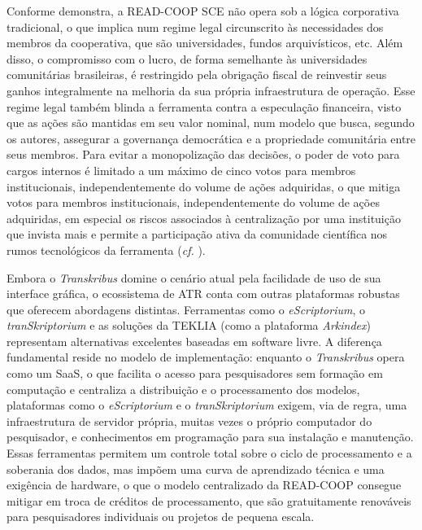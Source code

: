 \documentclass[portuguese]{textolivre}
\begin{document}
Conforme \textcite{terras2025artificial} demonstra, a READ-COOP SCE não opera sob a lógica corporativa tradicional, o que implica num regime legal circunscrito às necessidades dos membros da cooperativa, que são universidades, fundos arquivísticos, etc. Além disso, o compromisso com o lucro, de forma semelhante às universidades comunitárias brasileiras, é restringido pela obrigação fiscal de reinvestir seus ganhos integralmente na melhoria da sua própria infraestrutura de operação. Esse regime legal também blinda a ferramenta contra a especulação financeira, visto que as ações são mantidas em seu valor nominal, num modelo que busca, segundo os autores, assegurar a governança democrática e a propriedade comunitária entre seus membros. Para evitar a monopolização das decisões, o poder de voto para cargos internos é limitado a um máximo de cinco votos para membros institucionais, independentemente do volume de ações adquiridas, o que mitiga votos para membros institucionais, independentemente do volume de ações adquiridas, em especial os riscos associados à centralização por uma instituição que invista mais e permite a participação ativa da comunidade científica nos rumos tecnológicos da ferramenta (\textit{cf.} \textcite[p.~4-5]{terras2025artificial}).

Embora o \textit{Transkribus }domine o cenário atual pela facilidade de uso de sua interface gráfica, o ecossistema de ATR conta com outras plataformas robustas que oferecem abordagens distintas. Ferramentas como o \textit{eScriptorium}, o \textit{tranSkriptorium }e as soluções da TEKLIA (como a plataforma \textit{Arkindex}) representam alternativas excelentes baseadas em software livre. A diferença fundamental reside no modelo de implementação: enquanto o \textit{Transkribus} opera como um SaaS, o que facilita o acesso para pesquisadores sem formação em computação e centraliza a distribuição e o processamento dos modelos, plataformas como o \textit{eScriptorium} e o \textit{tranSkriptorium} exigem, via de regra, uma infraestrutura de servidor própria, muitas vezes o próprio computador do pesquisador, e conhecimentos em programação para sua instalação e manutenção. Essas ferramentas permitem um controle total sobre o ciclo de processamento e a soberania dos dados, mas impõem uma curva de aprendizado técnica e uma exigência de hardware, o que o modelo centralizado da READ-COOP consegue mitigar em troca de créditos de processamento, que são gratuitamente renováveis para pesquisadores individuais ou projetos de pequena escala.
\end{document}
